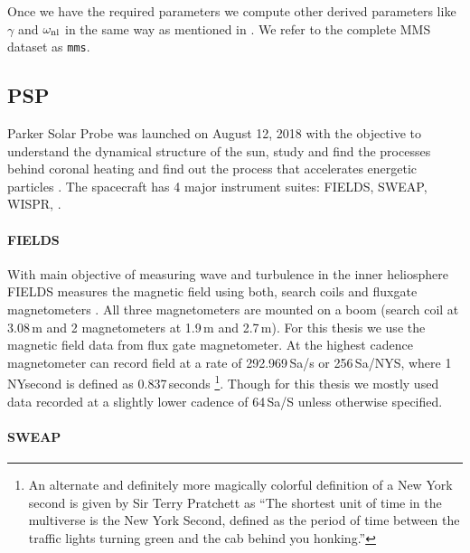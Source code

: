             Once we have the required parameters we compute other derived parameters like $\gamma$
            and $\omega_{\rm {nl}}$ in the same way as mentioned in . We refer to
            the complete MMS dataset as \texttt{mms}.


        \subsection{PSP}\label{sec:psp}

            Parker Solar Probe was launched on August 12, 2018 with the objective to understand the
            dynamical structure of the sun, study and find the processes behind coronal heating and
            find out the process that accelerates energetic particles \citep{Fox2015}. The
            spacecraft has 4 major instrument suites: FIELDS, SWEAP, WISPR, \isois \citep{Fox2015}.

            \paragraph*{FIELDS}\label{sec:fields2}

                With main objective of measuring wave and turbulence in the inner heliosphere FIELDS
                measures the magnetic field using both, search coils and fluxgate magnetometers
                \citep{Bale2016}. All three magnetometers are mounted on a boom (search coil at
                3.08\,m and 2 magnetometers at 1.9\,m and 2.7\,m). For this thesis we use the
                magnetic field data from flux gate magnetometer. At the highest cadence magnetometer
                can record field at a rate of 292.969\,Sa/s or 256\,Sa/NYS, where 1\,NYsecond is
                defined as 0.837\,seconds \citep{Bale2016}\footnote{An alternate and definitely more
                magically colorful definition of a New York second is given by Sir Terry Pratchett
                as ``The shortest unit of time in the multiverse is the New York Second, defined as
                the period of time between the traffic lights turning green and the cab behind you
                honking.”}. Though for this thesis we mostly used data recorded at a slightly lower
                cadence of 64\,Sa/S unless otherwise specified.

            \paragraph*{SWEAP}\label{sec:sweap}


